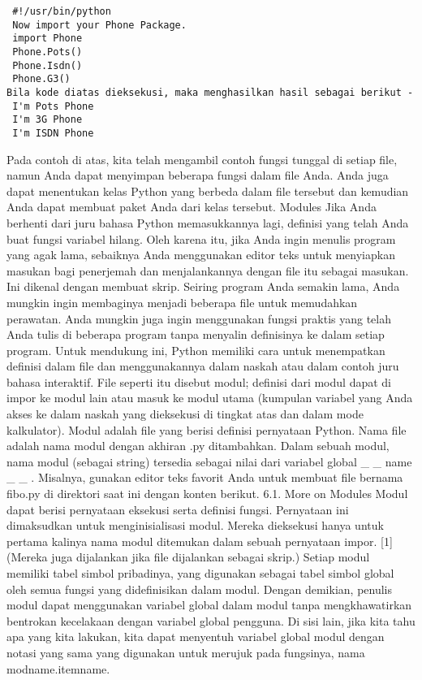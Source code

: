  \begin{verbatim}
 #!/usr/bin/python 
 Now import your Phone Package. 
 import Phone 
 Phone.Pots()  
 Phone.Isdn() 
 Phone.G3() 
Bila kode diatas dieksekusi, maka menghasilkan hasil sebagai berikut -  
 I'm Pots Phone  
 I'm 3G Phone  
 I'm ISDN Phone 
 \end{verbatim}
Pada contoh di atas, kita telah mengambil contoh fungsi tunggal di setiap file, namun Anda dapat menyimpan beberapa fungsi dalam file Anda. Anda juga dapat menentukan kelas Python yang berbeda dalam file tersebut dan kemudian Anda dapat membuat paket Anda dari kelas tersebut.
Modules  
Jika Anda berhenti dari juru bahasa Python  memasukkannya lagi, definisi yang telah Anda buat fungsi  variabel hilang. Oleh karena itu, jika Anda ingin menulis program yang agak lama, sebaiknya Anda menggunakan editor teks untuk menyiapkan masukan bagi penerjemah dan menjalankannya dengan file itu sebagai masukan. Ini dikenal dengan membuat skrip. Seiring program Anda semakin lama, Anda mungkin ingin membaginya menjadi beberapa file untuk memudahkan perawatan. Anda mungkin juga ingin menggunakan fungsi praktis yang telah Anda tulis di beberapa program tanpa menyalin definisinya ke dalam setiap program.  
Untuk mendukung ini, Python memiliki cara untuk menempatkan definisi dalam file dan menggunakannya dalam naskah atau dalam contoh juru bahasa interaktif. File seperti itu disebut modul; definisi dari modul dapat di impor ke modul lain atau masuk ke modul utama (kumpulan variabel yang Anda akses ke dalam naskah yang dieksekusi di tingkat atas dan dalam mode kalkulator).  
Modul adalah file yang berisi definisi  pernyataan Python. Nama file adalah nama modul dengan akhiran .py ditambahkan. Dalam sebuah modul, nama modul (sebagai string) tersedia sebagai nilai dari variabel global    \_     \_  name   \_     \_  . Misalnya, gunakan editor teks favorit Anda untuk membuat file bernama fibo.py di direktori saat ini dengan konten berikut.  
6.1. More on Modules 
Modul dapat berisi pernyataan eksekusi serta definisi fungsi. Pernyataan ini dimaksudkan untuk menginisialisasi modul. Mereka dieksekusi hanya untuk pertama kalinya nama modul ditemukan dalam sebuah pernyataan impor. [1] (Mereka juga dijalankan jika file dijalankan sebagai skrip.)  
Setiap modul memiliki tabel simbol pribadinya, yang digunakan sebagai tabel simbol global oleh semua fungsi yang didefinisikan dalam modul. Dengan demikian, penulis modul dapat menggunakan variabel global dalam modul tanpa mengkhawatirkan bentrokan kecelakaan dengan variabel global pengguna. Di sisi lain, jika kita tahu apa yang kita lakukan, kita dapat menyentuh variabel global modul dengan notasi yang sama yang digunakan untuk merujuk pada fungsinya, nama modname.itemname. 
